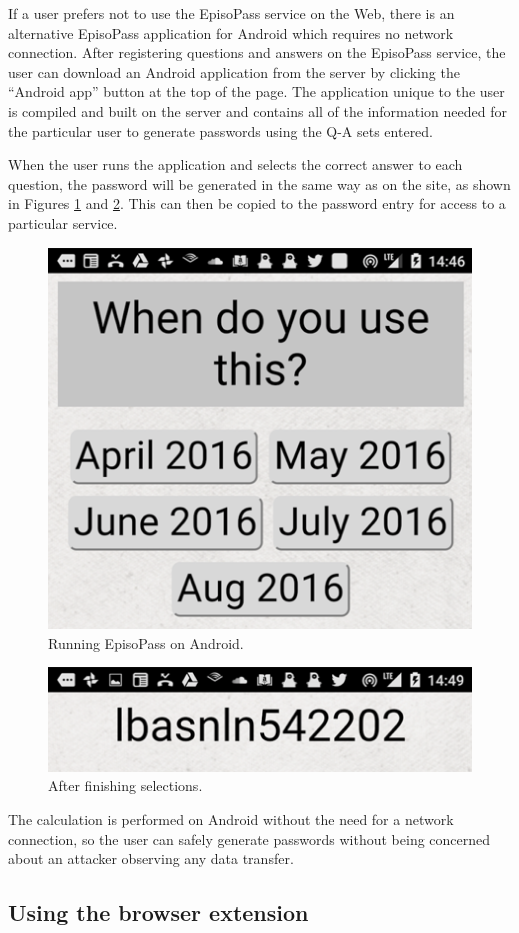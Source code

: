 \documentclass[runningheads,a4paper]{llncs}
\begin{document}
If a user prefers not to use the EpisoPass service on the Web, there
is an alternative EpisoPass application for Android which requires no
network connection.  After registering questions and answers on the
EpisoPass service, the user can download an Android application from
the server by clicking the ``Android app'' button at the top of the
page.  The application unique to the user is compiled and built on the
server and contains all of the information needed for the particular
user to generate passwords using the Q-A sets entered.

When the user runs the application and selects the correct answer
to each question, the password will be generated in the same way as
on the site, as shown in Figures \ref{android1} and \ref{android2}.
This can then be copied to the password entry for access
to a particular service.

\begin{figure}
\centering
\includegraphics[width=0.4\columnwidth]{figures/429eec261024dc6c85351f51c12f09b4}
\caption{Running EpisoPass on Android.}
\label{android1}
\end{figure}

\begin{figure}
\centering
\includegraphics[width=0.4\columnwidth]{figures/ba8f5aeaa935ad63437969f4d746746b}
\caption{After finishing selections.}
\label{android2}
\end{figure}

The calculation is performed on Android without the need for a network connection,
so the user can safely generate passwords without being concerned about an
attacker observing any data transfer.

\subsection{Using the browser extension}
\label{extensionsection}
\end{document}
